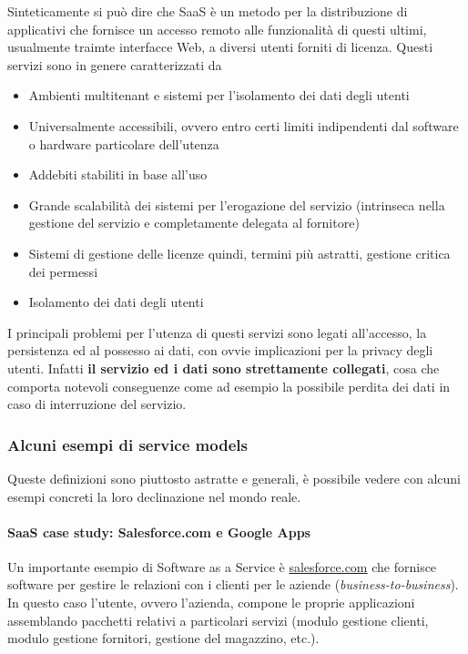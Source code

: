 Sinteticamente si può dire che SaaS è un metodo per la distribuzione di
applicativi che fornisce un accesso remoto alle funzionalità di questi
ultimi, usualmente traimte interfacce Web, a diversi utenti forniti di
licenza. Questi servizi sono in genere caratterizzati da

\begin{itemize}
\tightlist
\item
  Ambienti multitenant e sistemi per l'isolamento dei dati degli utenti
\item
  Universalmente accessibili, ovvero entro certi limiti indipendenti dal
  software o hardware particolare dell'utenza
\item
  Addebiti stabiliti in base all'uso
\item
  Grande scalabilità dei sistemi per l'erogazione del servizio
  (intrinseca nella gestione del servizio e completamente delegata al
  fornitore)
\item
  Sistemi di gestione delle licenze quindi, termini più astratti,
  gestione critica dei permessi
\item
  Isolamento dei dati degli utenti
\end{itemize}

I principali problemi per l'utenza di questi servizi sono legati
all'accesso, la persistenza ed al possesso ai dati, con ovvie
implicazioni per la privacy degli utenti. Infatti \textbf{il servizio ed
i dati sono strettamente collegati}, cosa che comporta notevoli
conseguenze come ad esempio la possibile perdita dei dati in caso di
interruzione del servizio.

\subsubsection{Alcuni esempi di service
models}\label{alcuni-esempi-di-service-models}

Queste definizioni sono piuttosto astratte e generali, è possibile
vedere con alcuni esempi concreti la loro declinazione nel mondo reale.

\paragraph{SaaS case study: Salesforce.com e Google
Apps}\label{saas-case-study-salesforce.com-e-google-apps}

Un importante esempio di Software as a Service è
\href{www.salesforce.com}{salesforce.com} che fornisce software per
gestire le relazioni con i clienti per le aziende
(\emph{business-to-business}). In questo caso l'utente, ovvero
l'azienda, compone le proprie applicazioni assemblando pacchetti
relativi a particolari servizi (modulo gestione clienti, modulo gestione
fornitori, gestione del magazzino, etc.).

